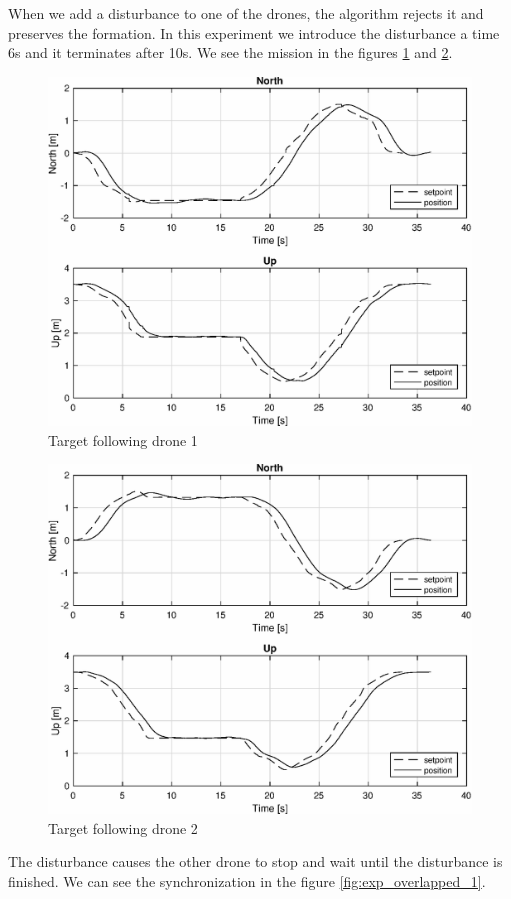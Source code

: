 When we add a disturbance to one of the drones, the algorithm rejects it and preserves
the formation. In this experiment we introduce the disturbance a time 6s and it
terminates after 10s. We see the mission in the figures \ref{fig:exp_following_1_1}
and \ref{fig:exp_following_2_1}.

\begin{figure}
\centering
\includegraphics[width=0.7\linewidth]{chapters/chapter-05/figures/following_1_1.eps}
\caption{Target following drone 1}
\label{fig:exp_following_1_1}
\end{figure}

\begin{figure}
\centering
\includegraphics[width=0.7\linewidth]{chapters/chapter-05/figures/following_2_1.eps}
\caption{Target following drone 2}
\label{fig:exp_following_2_1}
\end{figure}

The disturbance causes the other drone to stop and wait until the disturbance
is finished. We can see the synchronization in the figure \ref{fig:exp_overlapped_1}.

